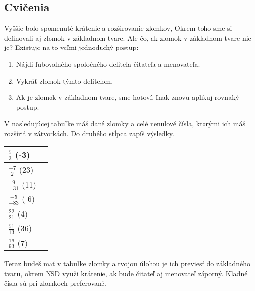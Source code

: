 \documentclass[12pt]{article}
\begin{document}
	\subsection{Cvičenia}
	\qquad Vyššie bolo spomenuté krátenie a rozširovanie zlomkov, Okrem toho sme si definovali aj zlomok v základnom tvare. Ale čo, ak zlomok v základnom tvare nie je? Existuje na to veľmi jednoduchý postup:\\
	\begin{enumerate}
		\item Nájdi ľubovoľného spoločného deliteľa čitateľa a menovateľa.
		\item Vykráť zlomok týmto deliteľom.
		\item Ak je zlomok v základnom tvare, sme hotoví. Inak znovu aplikuj rovnaký postup.
	\end{enumerate}
	
	V nasledujúcej tabuľke máš dané zlomky a celé nenulové čísla, ktorými ich máš rozšíriť v zátvorkách. Do druhého stĺpca zapíš výsledky.
	\newline
	\begin{table}[!hbt]
		\centering
		\begin{tabular}{|l|l|}
			\hline
			$\frac{5}{3}$ (-3)&\hspace{2cm} \\
			\hline
			$\frac{-7}{2}$ (23)&\hspace{2cm} \\
			\hline
			$\frac{9}{-31}$ (11)&\hspace{2cm} \\
			\hline
			$\frac{-5}{-83}$ (-6)&\hspace{2cm} \\
			\hline
			$\frac{22}{21}$ (4)&\hspace{2cm} \\
			\hline
			$\frac{51}{13}$ (36)&\hspace{2cm} \\
			\hline
			$\frac{16}{93}$ (7)&\hspace{2cm} \\
			\hline
		\end{tabular}
	\end{table}
	\newline
	
	Teraz budeš mať v tabuľke zlomky a tvojou úlohou je ich previesť do základného tvaru, okrem NSD využi krátenie, ak bude čitateľ aj menovateľ záporný. Kladné čísla sú pri zlomkoch preferované.\\
	
\end{document}
